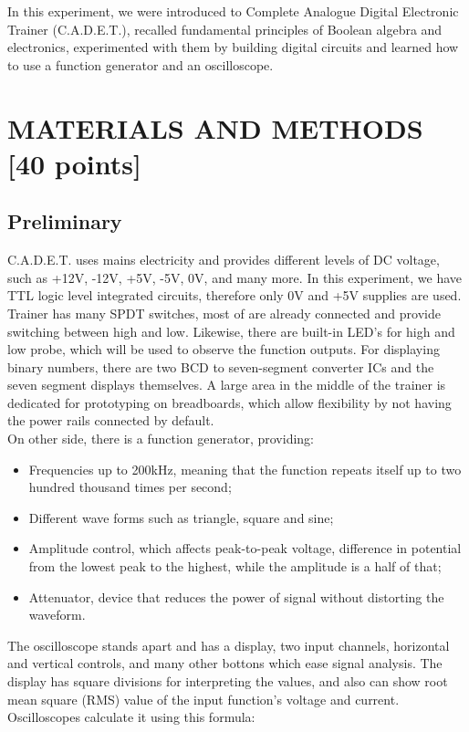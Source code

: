 \documentclass[pdftex,12pt,a4paper]{article}
\begin{document}
In this experiment, we were introduced to Complete Analogue Digital Electronic Trainer (C.A.D.E.T.), recalled fundamental principles of Boolean algebra and electronics, experimented with them by building digital circuits and learned how to use a function generator and an oscilloscope.  

\section{MATERIALS AND METHODS [40 points]}


\subsection{Preliminary}

C.A.D.E.T. uses mains electricity and provides different levels of DC voltage, such as +12V, -12V, +5V, -5V, 0V, and many more. In this experiment, we have TTL logic level integrated circuits, therefore only 0V and +5V supplies are used. Trainer has many SPDT switches, most of are already connected and provide switching between high and low. Likewise, there are built-in LED's for high and low probe, which will be used to observe the function outputs. For displaying binary numbers, there are two BCD to seven-segment converter ICs and the seven segment displays themselves. A large area in the middle of the trainer is dedicated for prototyping on breadboards, which allow flexibility by not having the power rails connected by default. \\

On other side, there is a function generator, providing:
\begin{itemize}
 \item Frequencies up to 200kHz, meaning that the function repeats itself up to two hundred thousand times per second; 
 \item Different wave forms such as triangle, square and sine; 
 \item Amplitude control, which affects peak-to-peak voltage, difference in potential from the lowest peak to the highest, while the amplitude is a half of that;
 \item Attenuator, device that reduces the power of signal without distorting the waveform.
\end{itemize}

The oscilloscope stands apart and has a display, two input channels, horizontal and vertical controls, and many other bottons which ease signal analysis. The display has square divisions for interpreting the values, and also can show root mean square (RMS) value of the input function's voltage and current. Oscilloscopes calculate it using this formula:
\end{document}

